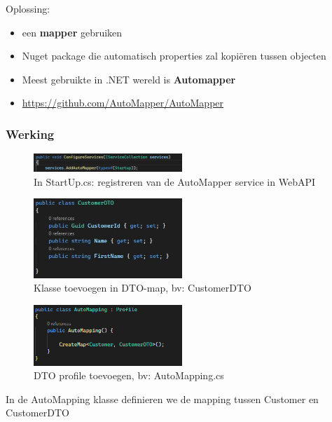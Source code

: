 \documentclass{article}
\begin{document}
Oplossing:

\begin{itemize}
    \item een \textbf{mapper} gebruiken
    \item Nuget package die automatisch properties zal kopiëren tussen objecten
    \item Meest gebruikte in .NET wereld is \textbf{Automapper}
    \item \url{https://github.com/AutoMapper/AutoMapper}
\end{itemize}

\subsubsection{Werking}

\begin{figure}[H]
    \centering
    \includegraphics[width=0.5\textwidth]{dto-startup.png}
    \caption{In StartUp.cs: registreren van de AutoMapper service in WebAPI}
\end{figure}

\begin{figure}[H]
    \centering
    \includegraphics[width=0.5\textwidth]{dto-klasse.png}
    \caption{Klasse toevoegen in DTO-map, bv: CustomerDTO}
\end{figure}

\begin{figure}[H]
    \centering
    \includegraphics[width=0.5\textwidth]{dto-profile.png}
    \caption{DTO profile toevoegen, bv: AutoMapping.cs}
\end{figure}

In de AutoMapping klasse definieren we de mapping tussen Customer en CustomerDTO
\end{document}
